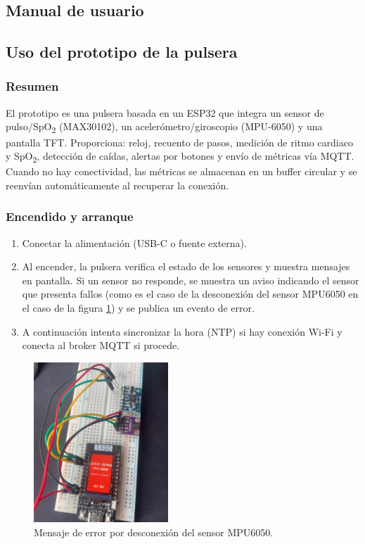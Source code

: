 \documentclass[12pt, a4paper]{article}
\begin{document}
\begin{umaappendices}
	
	\section{Manual de usuario}
	
	\subsection{Uso del prototipo de la pulsera}
		\label{sec:proto}
	
	\subsubsection{Resumen}
	El prototipo es una pulsera basada en un ESP32 que integra un sensor de pulso/SpO\textsubscript{2} (MAX30102), un acelerómetro/giroscopio (MPU-6050) y una pantalla TFT. Proporciona: reloj, recuento de pasos, medición de ritmo cardiaco y SpO\textsubscript{2}, detección de caídas, alertas por botones y envío de métricas vía MQTT. Cuando no hay conectividad, las métricas se almacenan en un buffer circular y se reenvían automáticamente al recuperar la conexión.
	
	\subsubsection{Encendido y arranque}
	\begin{enumerate}
		\item Conectar la alimentación (USB-C o fuente externa).
		\item Al encender, la pulsera verifica el estado de los sensores y muestra mensajes en pantalla. Si un sensor no responde, se muestra un aviso indicando el sensor que presenta fallos (como es el caso de la desconexión del sensor MPU6050 en el caso de la figura \ref{fig:sensor}) y se publica un evento de error.
		\item A continuación intenta sincronizar la hora (NTP) si hay conexión Wi-Fi y conecta al broker MQTT si procede.
	\end{enumerate}
	
	\begin{figure}[htbp]
		\centering
		\includegraphics[width=0.45\textwidth]{images/error.jpg}
		\caption[Ejemplo]{Mensaje de error por desconexión del sensor MPU6050.}
		\label{fig:sensor}
	\end{figure}
	

\end{umaappendices}
\end{document}
